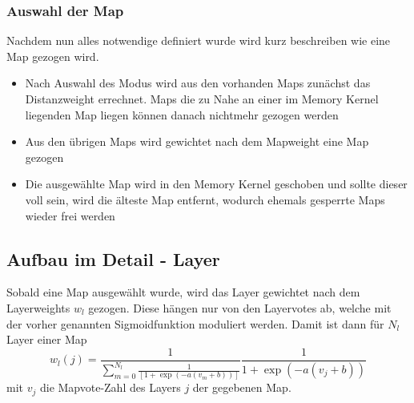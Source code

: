         \subsubsection{Auswahl der Map}
            Nachdem nun alles notwendige definiert wurde wird kurz beschreiben wie eine Map gezogen wird.
            \begin{itemize}
                \item Nach Auswahl des Modus wird aus den vorhanden Maps zunächst das Distanzweight errechnet. Maps die zu Nahe an einer im Memory Kernel liegenden Map liegen können danach nichtmehr gezogen werden
                \item Aus den übrigen Maps wird gewichtet nach dem Mapweight eine Map gezogen
                \item Die ausgewählte Map wird in den Memory Kernel geschoben und sollte dieser voll sein, wird die älteste Map entfernt, wodurch ehemals gesperrte Maps wieder frei werden
            \end{itemize}
    \subsection{Aufbau im Detail - Layer}
    Sobald eine Map ausgewählt wurde, wird das Layer gewichtet nach dem Layerweights $w_l$ gezogen.
    Diese hängen nur von den Layervotes ab, welche mit der vorher genannten Sigmoidfunktion moduliert werden.
    Damit ist dann für $N_l$ Layer einer Map
    \begin{equation}
        w_l(j) = \frac{1}{\sum_{m=0}^{N_l}\frac{1}{\left[1+\exp\left(-a(v_m+b)\right)\right]}}\frac{1}{1+\exp\left(-a(v_j+b)\right)}
    \end{equation}
    mit $v_j$ die Mapvote-Zahl des Layers $j$ der gegebenen Map.
